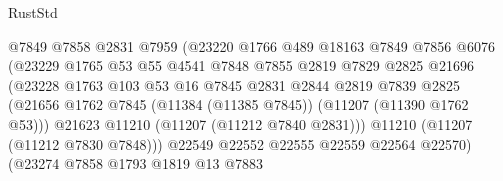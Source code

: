 \begin{lexlean}{RustStd}
\begin{coremodule}
                                    @7849
                                    @7858
                                    @2831
                                    @7959
                                    (@23220
                                      @1766
                                      @489
                                      @18163
                                      @7849
                                      @7856
                                      @6076
                                      (@23229
                                        @1765
                                        @53
                                        @55
                                        @4541
                                        @7848
                                        @7855
                                        @2819
                                        @7829
                                        @2825
                                        @21696
                                        (@23228
                                          @1763
                                          @103
                                          @53
                                          @16
                                          @7845
                                          @2831
                                          @2844
                                          @2819
                                          @7839
                                          @2825
                                          (@21656
                                            @1762
                                            @7845
                                            (@11384 (@11385 @7845))
                                            (@11207 (@11390 @1762 @53)))
                                          @21623
                                          @11210
                                          (@11207 (@11212 @7840 @2831)))
                                        @11210
                                        (@11207 (@11212 @7830 @7848)))
                                      @22549
                                      @22552
                                      @22555
                                      @22559
                                      @22564
                                      @22570)
                                    (@23274
                                      @7858
                                      @1793
                                      @1819
                                      @13
                                      @7883

\end{coremodule}
\end{lexlean}
